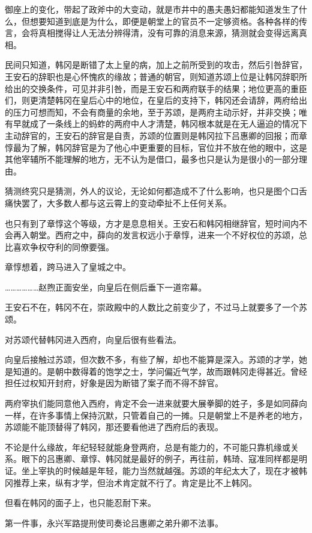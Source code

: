 御座上的变化，带起了政斧中的大变动，就是市井中的愚夫愚妇都能知道发生了什么，但想要知道到底是为什么，即便是朝堂上的官员不一定够资格。各种各样的传言，会将真相搅得让人无法分辨得清，没有可靠的消息来源，猜测就会变得远离真相。

民间只知道，韩冈是断错了太上皇的病，加上之前所受到的攻击，然后引咎辞官，王安石的辞职也是心怀愧疚的缘故；普通的朝官，则知道苏颂上位是让韩冈辞职所给出的交换条件，可见并非引咎，而是王安石和两府联手的结果；地位更高的重臣们，则更清楚韩冈在皇后心中的地位，在皇后的支持下，韩冈还会请辞，两府给出的压力可想而知，不会有商量的余地，至于苏颂，是两府主动示好，并非交换；唯有早就成了一条线上的蚂蚱的两府中人才清楚，韩冈根本就是在无人逼迫的情况下主动辞官的，王安石的辞官是自责，苏颂的位置则是韩冈拉下吕惠卿的回报；而章惇最为了解，韩冈辞官是为了他心中更重要的目标，官位并不放在他的眼中，这是其他宰辅所不能理解的地方，无不认为是借口，最多也只是认为是很小的一部分理由。

猜测终究只是猜测，外人的议论，无论如何都造成不了什么影响，也只是图个口舌痛快罢了，大多数人都与这云霄上的变动牵扯不上任何关系。

也只有到了章惇这个等级，方才是息息相关。王安石和韩冈相继辞官，短时间内不会再入朝堂。西府之中，薛向的发言权远小于章惇，进来一个不好权位的苏颂，总比喜欢争权夺利的同僚要强。

章惇想着，跨马进入了皇城之中。

………………赵煦正面安坐，向皇后在侧后垂下一道帘幕。

王安石不在，韩冈不在，崇政殿中的人数比之前变少了，不过马上就要多了一个苏颂。

对苏颂代替韩冈进入西府，向皇后很有些看法。

向皇后接触过苏颂，但次数不多，有些了解，却也不能算是深入。苏颂的才学，她是知道的。是朝中数得着的饱学之士，学问偏近气学，故而跟韩冈走得甚近。曾经担任过权知开封府，好象是因为断错了案子而不得不辞官。

两府宰执们能同意他入西府，肯定不会一进来就要大展拳脚的姓子，多是如同薛向一样，在许多事情上保持沉默，只管着自己的一摊。只是朝堂上不是养老的地方，苏颂能不能顶替得了韩冈，那还要看他进了西府后的表现。

不论是什么缘故，年纪轻轻就能身登两府，总是有能力的，不可能只靠机缘或关系。眼下的吕惠卿、章惇、韩冈就是最好的例子，再往前，韩琦、寇准同样都是明证。坐上宰执的时候越是年轻，能力当然就越强。苏颂的年纪太大了，现在才被韩冈推荐上来，纵有才学，但治术肯定就不行了。肯定是比不上韩冈。

但看在韩冈的面子上，也只能忍耐下来。

第一件事，永兴军路提刑使司奏论吕惠卿之弟升卿不法事。

